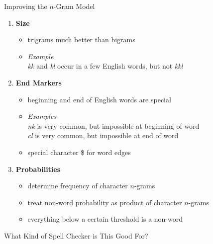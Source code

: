 \documentclass[professionalfonts, xcolor={usenames,svgnames,x11names,table}]{beamer}
\begin{document}
\begin{frame}{Improving the $n$-Gram Model}
    \begin{enumerate}
        \item \textbf{Size}
            \begin{itemize}
                \item trigrams much better than bigrams
                \item \emph{Example}\\
                    \emph{kk} and \emph{kl} occur in a few English words, but not \emph{kkl}
            \end{itemize}
        \item \textbf{End Markers}
            \begin{itemize}
                \item beginning and end of English words are special
                \item \emph{Examples}\\
                    \emph{nk} is very common, but impossible at beginning of word\\
                    \emph{cl} is very common, but impossible at end of word
                \item special character \$ for word edges\\
            \end{itemize}
        \item \textbf{Probabilities}
            \begin{itemize}
                \item determine frequency of character $n$-grams
                \item treat non-word probability as product of character $n$-grams
                \item everything below a certain threshold is a non-word
            \end{itemize}
    \end{enumerate}
\end{frame}

\begin{frame}{What Kind of Spell Checker is This Good For?}
    
\end{frame}
\end{document}
